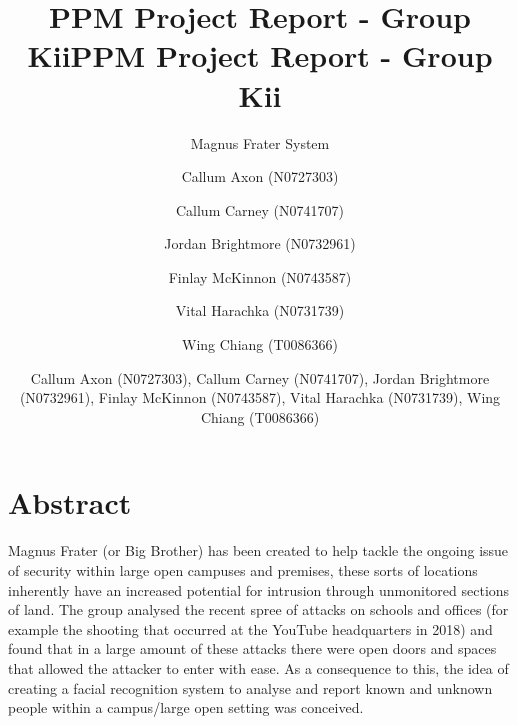 \documentclass[
  english,
  a4paper,
,tablecaptionabove
]{scrartcl}
\title{PPM Project Report - Group Kii}
\subtitle{Magnus Frater System}
\author{Callum Axon (N0727303) \and Callum Carney (N0741707) \and Jordan Brightmore (N0732961) \and Finlay McKinnon (N0743587) \and Vital Harachka (N0731739) \and Wing Chiang (T0086366)}
\date{}
\title{PPM Project Report - Group Kii}
\author{Callum Axon (N0727303), Callum Carney (N0741707), Jordan Brightmore (N0732961), Finlay McKinnon (N0743587), Vital Harachka (N0731739), Wing Chiang (T0086366)}
\begin{document}

\begin{titlepage}
\afterpage{\restorepagecolor}
\newcommand{\colorRule}[3][black]{\textcolor[HTML]{#1}{\rule{#2}{#3}}}
\end{titlepage}
\restoregeometry




\hypertarget{abstract}{%
\section{Abstract}\label{abstract}}

Magnus Frater (or Big Brother) has been created to help tackle the
ongoing issue of security within large open campuses and premises, these
sorts of locations inherently have an increased potential for intrusion
through unmonitored sections of land. The group analysed the recent
spree of attacks on schools and offices (for example the shooting that
occurred at the YouTube headquarters in 2018) and found that in a large
amount of these attacks there were open doors and spaces that allowed
the attacker to enter with ease. As a consequence to this, the idea of
creating a facial recognition system to analyse and report known and
unknown people within a campus/large open setting was conceived.
\end{document}
